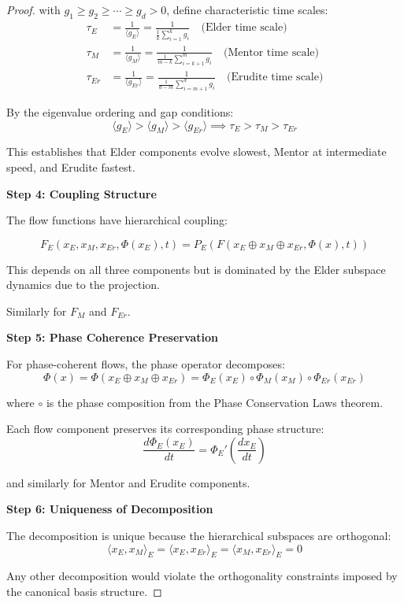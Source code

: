 \begin{proof}
with $g_1 \geq g_2 \geq \cdots \geq g_d > 0$, define characteristic time scales:
\begin{align}
\tau_E &= \frac{1}{\langle g_E \rangle} = \frac{1}{\frac{1}{k}\sum_{i=1}^{k} g_i} \quad \text{(Elder time scale)} \\
\tau_M &= \frac{1}{\langle g_M \rangle} = \frac{1}{\frac{1}{m-k}\sum_{i=k+1}^{m} g_i} \quad \text{(Mentor time scale)} \\
\tau_{Er} &= \frac{1}{\langle g_{Er} \rangle} = \frac{1}{\frac{1}{d-m}\sum_{i=m+1}^{d} g_i} \quad \text{(Erudite time scale)}
\end{align}

By the eigenvalue ordering and gap conditions:
$$\langle g_E \rangle > \langle g_M \rangle > \langle g_{Er} \rangle \implies \tau_E > \tau_M > \tau_{Er}$$

This establishes that Elder components evolve slowest, Mentor at intermediate speed, and Erudite fastest.

\textbf{Step 4: Coupling Structure}

The flow functions have hierarchical coupling:

$$F_E(x_E, x_M, x_{Er}, \Phi(x_E), t) = P_E(F(x_E \oplus x_M \oplus x_{Er}, \Phi(x), t))$$

This depends on all three components but is dominated by the Elder subspace dynamics due to the projection.

Similarly for $F_M$ and $F_{Er}$.

\textbf{Step 5: Phase Coherence Preservation}

For phase-coherent flows, the phase operator decomposes:
$$\Phi(x) = \Phi(x_E \oplus x_M \oplus x_{Er}) = \Phi_E(x_E) \circ \Phi_M(x_M) \circ \Phi_{Er}(x_{Er})$$

where $\circ$ is the phase composition from the Phase Conservation Laws theorem.

Each flow component preserves its corresponding phase structure:
$$\frac{d\Phi_E(x_E)}{dt} = \Phi_E'\left(\frac{dx_E}{dt}\right)$$

and similarly for Mentor and Erudite components.

\textbf{Step 6: Uniqueness of Decomposition}

The decomposition is unique because the hierarchical subspaces are orthogonal:
$$\langle x_E, x_M \rangle_E = \langle x_E, x_{Er} \rangle_E = \langle x_M, x_{Er} \rangle_E = 0$$

Any other decomposition would violate the orthogonality constraints imposed by the canonical basis structure.


\end{proof}
